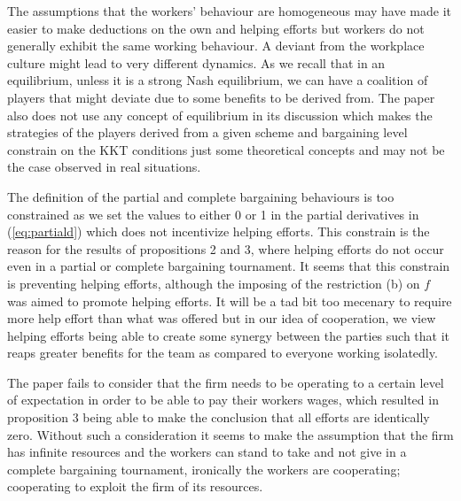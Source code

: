 \documentclass[a4paper,10pt]{article}
\theoremstyle{definition}
\begin{document}
The assumptions that the workers' behaviour are homogeneous may have made it easier to make deductions on the own and helping efforts but workers do not generally exhibit the same working behaviour. A deviant from the workplace culture might lead to very different dynamics. As we recall that in an equilibrium, unless it is a strong Nash equilibrium, we can have a coalition of players that might deviate due to some benefits to be derived from. The paper also does not use any concept of equilibrium in its discussion which makes the strategies of the players derived from a given scheme and bargaining level constrain on the KKT conditions just some theoretical concepts and may not be the case observed in real situations.

The definition of the partial and complete bargaining behaviours is too constrained as we set the values to either 0 or 1 in the partial derivatives in (\ref{eq:partiald}) which does not incentivize helping efforts. This constrain is the reason for the results of propositions 2 and 3, where helping efforts do not occur even in a partial or complete bargaining tournament.  It seems that this constrain is preventing  helping efforts, although the imposing of the restriction (b) on $f$ was aimed to promote helping efforts. It will be a tad bit too mecenary to require more help effort than what was offered but in our idea of cooperation, we view helping efforts being able to create some synergy between the parties such that it reaps greater benefits for the team as compared to everyone working isolatedly.

The paper fails to consider that the firm needs to be operating to a certain level of expectation in order to be able to pay their workers wages, which resulted in proposition 3 being able to make the conclusion that all efforts are identically zero. Without such a consideration it seems to make the assumption that the firm has infinite resources and the workers can stand to take and not give in a complete bargaining tournament, ironically the workers are cooperating; cooperating to exploit the firm of its resources.
\end{document}
